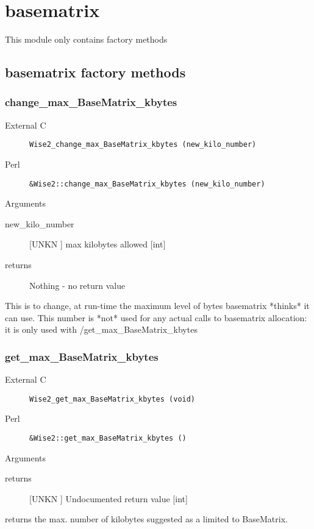 \section{basematrix}
\label{module_basematrix}
This module only contains factory methods

\subsection{basematrix factory methods}
\subsubsection{change_max_BaseMatrix_kbytes}
\begin{description}
\item[External C] {\tt Wise2_change_max_BaseMatrix_kbytes (new_kilo_number)}
\item[Perl] {\tt &Wise2::change_max_BaseMatrix_kbytes (new_kilo_number)}

\end{description}
Arguments
\begin{description}
\item[new_kilo_number] [UNKN ] max kilobytes allowed [int]
\item[returns] Nothing - no return value
\end{description}
This is to change, at run-time the maximum level of bytes basematrix *thinks*
it can use. This number is *not* used for any actual calls to basematrix
allocation: it is only used with /get_max_BaseMatrix_kbytes


\subsubsection{get_max_BaseMatrix_kbytes}
\begin{description}
\item[External C] {\tt Wise2_get_max_BaseMatrix_kbytes (void)}
\item[Perl] {\tt &Wise2::get_max_BaseMatrix_kbytes ()}

\end{description}
Arguments
\begin{description}
\item[returns] [UNKN ] Undocumented return value [int]
\end{description}
returns the max. number of kilobytes suggested as a limited
to BaseMatrix. 




